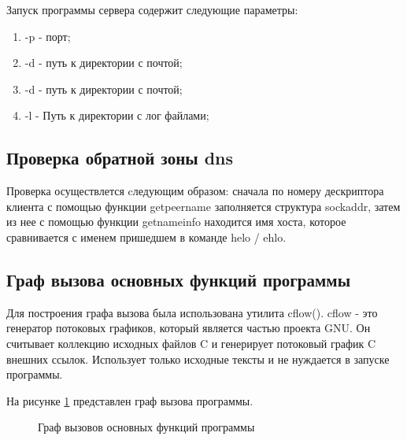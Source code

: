 \documentclass[a4paper,12pt]{report}
\begin{document}
Запуск программы сервера содержит следующие параметры:
\begin{enumerate}
	\item -p - порт;
    \item -d - путь к директории с почтой;
    \item -d - путь к директории с почтой;
    \item -l - Путь к директории с лог файлами;
\end{enumerate}



\subsection{Проверка обратной зоны dns}

Проверка осуществлется cледующим образом: сначала по номеру  дескриптора клиента с помощью функции getpeername заполняется структура sockaddr, затем из нее с помощью функции getnameinfo находится имя хоста, которое сравнивается с именем пришедшем в команде helo / ehlo.

\subsection{Граф вызова основных функций программы}

Для построения графа вызова была использована утилита cflow(\cite{cflow}). cflow - это генератор потоковых графиков, который является частью проекта GNU. Он считывает коллекцию исходных файлов C и генерирует потоковый график C внешних ссылок. Использует только исходные тексты и не нуждается в запуске программы.

На рисунке \ref{ris:calls} представлен граф вызова программы.

\begin{figure}[h!]
\caption{Граф вызовов основных функций программы}
\label{ris:calls}
\end{figure}
\end{document}
